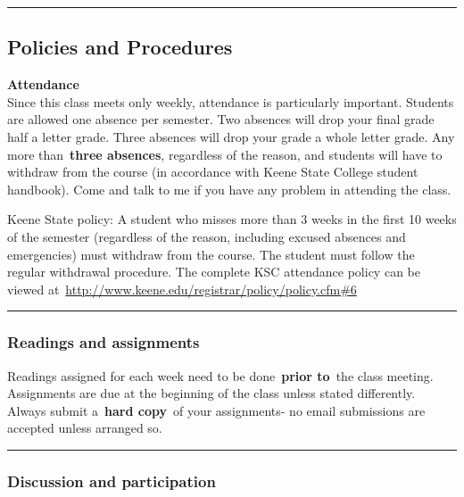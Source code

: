 \documentclass[
  letterpaper,
  DIV=11,
  numbers=noendperiod,
  oneside]{scrartcl}
\begin{document}
\begin{center}\rule{0.5\linewidth}{0.5pt}\end{center}

\subsection{Policies and Procedures}\label{policies-and-procedures}

\textbf{Attendance}\\
Since this class meets only weekly, attendance is particularly
important. Students are allowed one absence per semester. Two absences
will drop your final grade half a letter grade. Three absences will drop
your grade a whole letter grade. Any more than~\textbf{three absences},
regardless of the reason, and students will have to withdraw from the
course (in accordance with Keene State College student handbook). Come
and talk to me if you have any problem in attending the class.

Keene State policy: A student who misses more than 3 weeks in the first
10 weeks of the semester (regardless of the reason, including excused
absences and emergencies) must withdraw from the course. The student
must follow the regular withdrawal procedure. The complete KSC
attendance policy can be viewed
at~\url{http://www.keene.edu/registrar/policy/policy.cfm\#6}

\begin{center}\rule{0.5\linewidth}{0.5pt}\end{center}

\subsubsection{Readings and assignments}\label{readings-and-assignments}

Readings assigned for each week need to be done~\textbf{prior to}~the
class meeting. Assignments are due at the beginning of the class unless
stated differently. Always submit a~\textbf{hard copy}~of your
assignments- no email submissions are accepted unless arranged so.

\begin{center}\rule{0.5\linewidth}{0.5pt}\end{center}

\subsubsection{Discussion and
participation}\label{discussion-and-participation}
\end{document}

